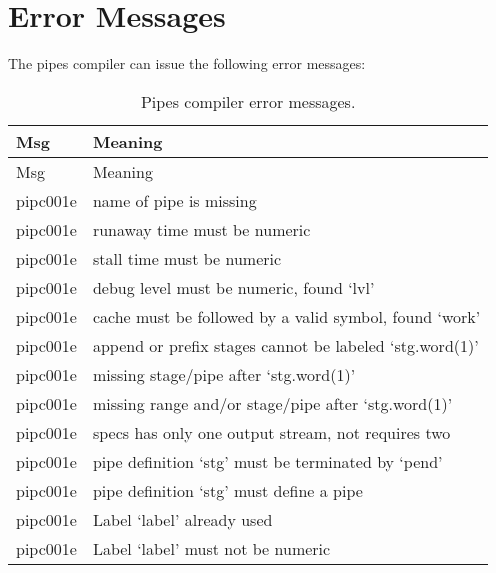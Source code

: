 \chapter{Error Messages}\label{error-messages}

The pipes compiler can issue the following error messages:

\begin{longtable}[]{@{}
  >{\raggedright\arraybackslash}p{}
  >{\raggedright\arraybackslash}p{}@{}}
\caption{Pipes compiler error messages.}\tabularnewline
\toprule\noalign{}
\begin{minipage}[b]{\linewidth}\raggedright
Msg
\end{minipage} & \begin{minipage}[b]{\linewidth}\raggedright
Meaning
\end{minipage} \\
\midrule\noalign{}
\endfirsthead
\toprule\noalign{}
\begin{minipage}[b]{\linewidth}\raggedright
Msg
\end{minipage} & \begin{minipage}[b]{\linewidth}\raggedright
Meaning
\end{minipage} \\
\midrule\noalign{}
\endhead
\bottomrule\noalign{}
\endlastfoot
pipc001e & name of pipe is missing \\
pipc001e & runaway time must be numeric \\
pipc001e & stall time must be numeric \\
pipc001e & debug level must be numeric, found `lvl' \\
pipc001e & cache must be followed by a valid symbol, found `work' \\
pipc001e & append or prefix stages cannot be labeled `stg.word(1)' \\
pipc001e & missing stage/pipe after `stg.word(1)' \\
pipc001e & missing range and/or stage/pipe after `stg.word(1)' \\
pipc001e & specs has only one output stream, not requires two \\
pipc001e & pipe definition `stg' must be terminated by `pend' \\
pipc001e & pipe definition `stg' must define a pipe \\
pipc001e & Label `label' already used \\
pipc001e & Label `label' must not be numeric \\

\end{longtable}
